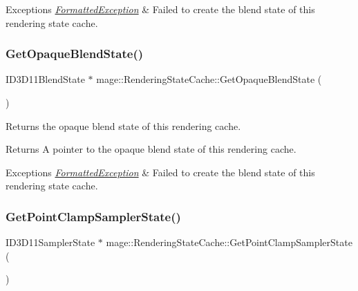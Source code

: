 \begin{DoxyExceptions}{Exceptions}
{\em \hyperlink{structmage_1_1_formatted_exception}{Formatted\+Exception}} & Failed to create the blend state of this rendering state cache. \\
\hline
\end{DoxyExceptions}
\hypertarget{structmage_1_1_rendering_state_cache_a7208ccd74aa075e5283ad91d0efdf455}{}\label{structmage_1_1_rendering_state_cache_a7208ccd74aa075e5283ad91d0efdf455} 
\subsubsection{\texorpdfstring{Get\+Opaque\+Blend\+State()}{GetOpaqueBlendState()}}
{\footnotesize\ttfamily I\+D3\+D11\+Blend\+State $\ast$ mage\+::\+Rendering\+State\+Cache\+::\+Get\+Opaque\+Blend\+State (\begin{DoxyParamCaption}{ }\end{DoxyParamCaption})}

Returns the opaque blend state of this rendering cache.

\begin{DoxyReturn}{Returns}
A pointer to the opaque blend state of this rendering cache. 
\end{DoxyReturn}

\begin{DoxyExceptions}{Exceptions}
{\em \hyperlink{structmage_1_1_formatted_exception}{Formatted\+Exception}} & Failed to create the blend state of this rendering state cache. \\
\hline
\end{DoxyExceptions}
\hypertarget{structmage_1_1_rendering_state_cache_aabf172b1363478d2570a242303e38838}{}\label{structmage_1_1_rendering_state_cache_aabf172b1363478d2570a242303e38838} 
\subsubsection{\texorpdfstring{Get\+Point\+Clamp\+Sampler\+State()}{GetPointClampSamplerState()}}
{\footnotesize\ttfamily I\+D3\+D11\+Sampler\+State $\ast$ mage\+::\+Rendering\+State\+Cache\+::\+Get\+Point\+Clamp\+Sampler\+State (\begin{DoxyParamCaption}{ }\end{DoxyParamCaption})}


